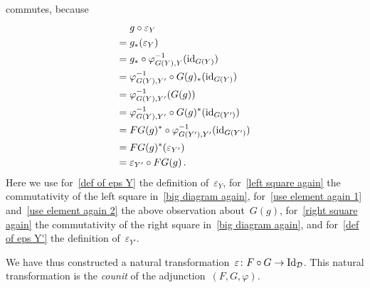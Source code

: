 \begin{remark}[label = triangle equalities]
\begin{enumerate}
\[      \]
      commutes, because
      \begin{align}
         {}&  g \circ \varepsilon_Y  \notag  \\
        ={}&  g_*( \varepsilon_Y )  \notag  \\
        ={}&  g_* \circ \varphi_{G(Y),Y}^{-1}( \operatorname{id}_{G(Y)} ) \label{def of eps Y}  \\
        ={}&  \varphi_{G(Y),Y'}^{-1} \circ G(g)_*( \operatorname{id}_{G(Y)} ) \label{left square again} \\
        ={}&  \varphi_{G(Y),Y'}^{-1}( G(g) )  \label{use element again 1} \\
        ={}&  \varphi_{G(Y),Y'}^{-1} \circ G(g)^*( \operatorname{id}_{G(Y')} )  \label{use element again 2} \\
        ={}&  FG(g)^* \circ \varphi_{G(Y'),Y'}^{-1}( \operatorname{id}_{G(Y')} )  \label{right square again}  \\
        ={}&  FG(g)^*( \varepsilon_{Y'} ) \label{def of eps Y'} \\
        ={}&  \varepsilon_{Y'} \circ FG(g)  \notag  \,.
      \end{align}
      Here we use for~\eqref{def of eps Y} the definition of~$\varepsilon_Y$, for~\eqref{left square again} the commutativity of the left square in~\eqref{big diagram again}, for~\eqref{use element again 1} and~\eqref{use element again 2} the above observation about~$G(g)$, for~\eqref{right square again} the commutativity of the right square in~\eqref{big diagram again}, and for~\eqref{def of eps Y'} the definition of~$\varepsilon_{Y'}$.
      
      We have thus constructed a natural transformation~$\varepsilon \colon F \circ G \to \mathrm{Id}_{\mathcal{D}}$.
      This natural transformation is the \emph{counit} of the adjunction~$(F,G,\varphi)$.
  \end{enumerate}
\end{remark}






